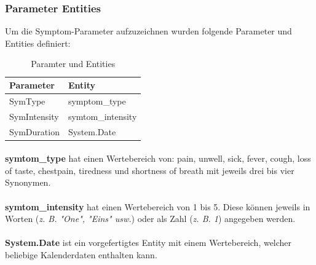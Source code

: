 \documentclass[11pt,a4paper]{article}
\begin{document}
        \subsubsection{Parameter Entities}
            Um die Symptom-Parameter aufzuzeichnen wurden folgende Parameter und Entities definiert:
            \begin{table}[!h]
                \begin{center}
                    \begin{tabular}{l|l}
                        \textbf{Parameter} & \textbf{Entity}\\
                        \hline
                        SymType & symptom\_type\\
                        SymIntensity & symtom\_intensity\\
                        SymDuration & System.Date
                    \end{tabular}
                    \caption{Paramter und Entities}
                    \label{tab:tabelleParamsUndEntities}
                \end{center}
            \end{table}


			\newpage
            
            
            \paragraph{}
                \textbf{symtom\_type} hat einen Wertebereich von: pain, unwell, sick, fever, cough, loss of taste, 
                chestpain, tiredness und shortness of breath mit jeweils drei bis vier Synonymen.
            
            \paragraph{}
                \textbf{symtom\_intensity} hat einen Wertebereich von 1 bis 5. Diese können jeweils in Worten 
                (\emph{z. B. "One", "Eins" usw.}) oder als Zahl (\emph{z. B. 1}) angegeben werden.
            
            \paragraph{}
                \textbf{System.Date} ist ein vorgefertigtes Entity mit einem Wertebereich, welcher beliebige Kalenderdaten
                enthalten kann.
                
\end{document}
